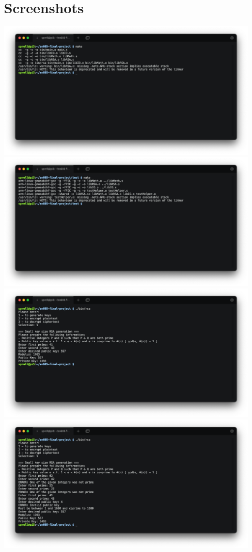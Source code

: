 \documentclass{article}
\begin{document}
\section{Screenshots}
\includegraphics[scale=0.40]{assets/make-proj.png}
\includegraphics[scale=0.40]{assets/make-test.png}
\includegraphics[scale=0.40]{assets/keygen.png}
\includegraphics[scale=0.40]{assets/keygen-werr.png}
\end{document}
